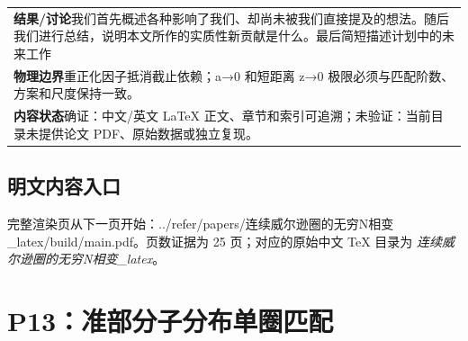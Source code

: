 \documentclass[UTF8,11pt,oneside]{ctexbook}
\begin{document}
\begin{table}[htbp]
\begin{tabular}{@{}p{}@{}}
    \textbf{结果/讨论}\quad 我们首先概述各种影响了我们、却尚未被我们直接提及的想法。随后我们进行总结，说明本文所作的实质性新贡献是什么。最后简短描述计划中的未来工作 \\
    \textbf{物理边界}\quad 重正化因子抵消截止依赖；a→0 和短距离 z→0 极限必须与匹配阶数、方案和尺度保持一致。 \\
    \textbf{内容状态}\quad 确证：中文/英文 LaTeX 正文、章节和索引可追溯；未验证：当前目录未提供论文 PDF、原始数据或独立复现。 \\
    \bottomrule
  \end{tabular}
\end{table}
\section*{明文内容入口}
\noindent 完整渲染页从下一页开始：../\allowbreak{}refer/\allowbreak{}papers/\allowbreak{}连续威尔逊圈的无穷N相变\_\allowbreak{}latex/\allowbreak{}build/\allowbreak{}main.pdf。页数证据为 25 页；对应的原始中文 TeX 目录为 \emph{连续威尔逊圈的无穷N相变\_latex}。
\clearpage

\clearpage

\chapter{P13：准部分子分布单圈匹配}
\end{document}
